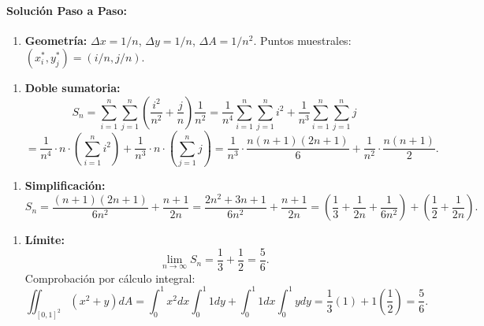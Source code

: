 \documentclass[11pt,a4paper]{article}
\begin{document}
\paragraph{Solución Paso a Paso:}\par
\begin{enumerate}[label=\textbf{\arabic*.}]
\item \textbf{Geometría:}
$\Delta x = 1/n$, $\Delta y = 1/n$, $\Delta A = 1/n^2$.
Puntos muestrales: $(x_i^*, y_j^*) = (i/n, j/n)$.
\end{enumerate}

\begin{enumerate}[label=\textbf{\arabic*.}]
\item \textbf{Doble sumatoria:}
\begin{equation*}
S_n = \sum_{i=1}^n \sum_{j=1}^n \left(\frac{i^2}{n^2} + \frac{j}{n}\right) \frac{1}{n^2} = \frac{1}{n^4} \sum_{i=1}^n \sum_{j=1}^n i^2 + \frac{1}{n^3} \sum_{i=1}^n \sum_{j=1}^n j
\end{equation*}
\begin{equation*}
= \frac{1}{n^4} \cdot n \cdot \left(\sum_{i=1}^n i^2\right) + \frac{1}{n^3} \cdot n \cdot \left(\sum_{j=1}^n j\right) = \frac{1}{n^3} \cdot \frac{n(n+1)(2n+1)}{6} + \frac{1}{n^2} \cdot \frac{n(n+1)}{2}.
\end{equation*}
\end{enumerate}

\begin{enumerate}[label=\textbf{\arabic*.}]
\item \textbf{Simplificación:}
\begin{equation*}
S_n = \frac{(n+1)(2n+1)}{6n^2} + \frac{n+1}{2n} = \frac{2n^2 + 3n + 1}{6n^2} + \frac{n+1}{2n} = \left(\frac{1}{3} + \frac{1}{2n} + \frac{1}{6n^2}\right) + \left(\frac{1}{2} + \frac{1}{2n}\right).
\end{equation*}
\end{enumerate}

\begin{enumerate}[label=\textbf{\arabic*.}]
\item \textbf{Límite:}
\begin{equation*}
\lim_{n\to\infty} S_n = \frac{1}{3} + \frac{1}{2} = \frac{5}{6}.
\end{equation*}
Comprobación por cálculo integral:
\begin{equation*}
\iint_{[0,1]^2} (x^2 + y) dA = \int_0^1 x^2 dx \int_0^1 1 dy + \int_0^1 1 dx \int_0^1 y dy = \frac{1}{3}(1) + 1\left(\frac{1}{2}\right) = \frac{5}{6}.
\end{equation*}
\end{enumerate}
\end{document}

